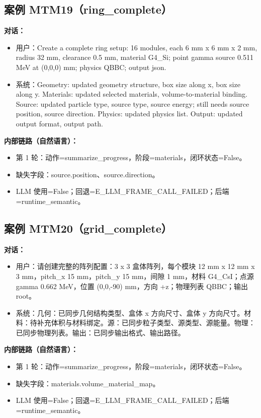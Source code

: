 \documentclass[11pt]{ctexart}
\begin{document}
\subsection{案例 MTM19（ring\_complete）}
\textbf{对话：}
\begin{itemize}
\item 用户：Create a complete ring setup: 16 modules, each 6 mm x 6 mm x 2 mm, radius 32 mm, clearance 0.5 mm, material G4\_Si; point gamma source 0.511 MeV at (0,0,0) mm; physics QBBC; output json.
\item 系统：Geometry: updated geometry structure, box size along x, box size along y. Materials: updated selected materials, volume-to-material binding. Source: updated particle type, source type, source energy; still needs source position, source direction. Physics: updated physics list. Output: updated output format, output path.
\end{itemize}
\textbf{内部链路（自然语言）：}
\begin{itemize}
\item 第 1 轮：动作=summarize\_progress，阶段=materials，闭环状态=False。
\item 缺失字段：source.position、source.direction。
\item LLM 使用=False；回退=E\_LLM\_FRAME\_CALL\_FAILED；后端=runtime\_semantic。
\end{itemize}
\subsection{案例 MTM20（grid\_complete）}
\textbf{对话：}
\begin{itemize}
\item 用户：请创建完整的阵列配置：3 x 3 盒体阵列，每个模块 12 mm x 12 mm x 3 mm，pitch\_x 15 mm，pitch\_y 15 mm，间隙 1 mm，材料 G4\_CsI；点源 gamma 0.662 MeV，位置 (0,0,-90) mm，方向 +z；物理列表 QBBC；输出 root。
\item 系统：几何：已同步几何结构类型、盒体 x 方向尺寸、盒体 y 方向尺寸。材料：待补充体积与材料绑定。源：已同步粒子类型、源类型、源能量。物理：已同步物理列表。输出：已同步输出格式、输出路径。
\end{itemize}
\textbf{内部链路（自然语言）：}
\begin{itemize}
\item 第 1 轮：动作=summarize\_progress，阶段=materials，闭环状态=False。
\item 缺失字段：materials.volume\_material\_map。
\item LLM 使用=False；回退=E\_LLM\_FRAME\_CALL\_FAILED；后端=runtime\_semantic。
\end{itemize}
\end{document}
